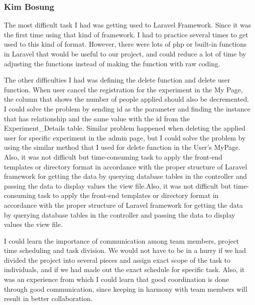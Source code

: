 \documentclass[letterpaper, 10 pt, conference]{ieeeconf}  %
\begin{document}
\subsubsection{Kim Bosung\\}
The most difficult task I had was getting used to Laravel Framework. Since it was the first time using that kind of framework. I had to practice several times to get used to this kind of format. However, there were lots of php or built-in functions in Laravel that would be useful to our project, and could reduce a lot of time by adjusting the functions instead of making the function with raw coding.\\
The other difficulties I had was defining the delete function and delete user function. When user cancel the registration for the experiment in the My Page, the column that shows the number of people applied should also be decremented. I could solve the problem by sending id as the parameter and finding the instance that has relationship and the same value with the id from the Experiment\_Details table. Similar problem happened when deleting the applied user for specific experiment in the admin page, but I could solve the problem by using the similar method that I used for delete function in the User’s MyPage.
Also, it was not difficult but time-consuming task to apply the front-end templates or directory format in accordance with the proper structure of Laravel framework for getting the data by querying database tables in the controller and passing the data to display values the view file.Also, it was not difficult but time-consuming task to apply the front-end templates or directory format in accordance with the proper structure of Laravel framework for getting the data by querying database tables in the controller and passing the data to display values the view file.\\
I could learn the importance of communication among team members, project time scheduling and task division. We would not have to be in a hurry if we had divided the project into several pieces and assign exact scope of the task to individuals, and if we had made out the exact schedule for specific task. Also, it was an experience from which I could learn that good coordination is done through good communication, since keeping in harmony with team members will result in better collaboration.
\end{document}

